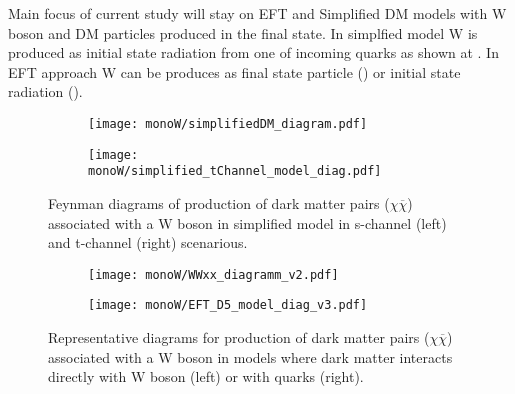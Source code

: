 Main focus of current study will stay on EFT and Simplified DM models with W boson and DM particles produced in the final state. 
In simplfied model W is produced as initial state radiation from one of incoming quarks as shown at . 
In EFT approach W can be produces as final state particle () or initial state radiation ().









\begin{figure}[]

\centering
\begin{subfigure}{.5\textwidth}
  \centering
  \texttt{[image: monoW/simplifiedDM\_diagram.pdf]}
\end{subfigure}%
\begin{subfigure}{.5\textwidth}
  \centering
  \texttt{[image: monoW/simplified\_tChannel\_model\_diag.pdf]}
\end{subfigure}
  \caption{Feynman diagrams of production of dark matter pairs ($\chi\overline{\chi}$) associated with a W boson in simplified model 
	   in s-channel (left) and t-channel (right) scenarious.}
  \label{fig:feynMonoWSimple}
\end{figure}


\begin{figure}[]

\centering
\begin{subfigure}{.5\textwidth}
  \centering
  \texttt{[image: monoW/WWxx\_diagramm\_v2.pdf]}
\end{subfigure}%
\begin{subfigure}{.5\textwidth}
  \centering
  \texttt{[image: monoW/EFT\_D5\_model\_diag\_v3.pdf]}
\end{subfigure}
  \caption{Representative diagrams for production of dark matter pairs ($\chi\overline{\chi}$) associated with a W boson in models where
dark matter interacts directly with W boson (left) or with quarks (right).}
  \label{fig:feynMonoWEFT}
\end{figure}

